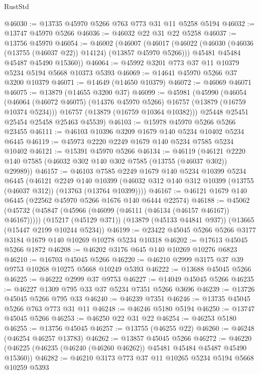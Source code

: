 \begin{lexlean}{RustStd}
\begin{coremodule}
@46030 := @13735 @45970 @5266 @763 @773 @31 @11 @5258 @5194
@46032 := @13747 @45970 @5266
@46036 := @46032 @22 @31 @22 @5258
@46037 := @13756 @45970
@46054 := @46002
    (@46007
      (@46017
        (@46022 (@46030 (@46036 (@13755 (@46037 @22)) @14124) (@13857 @45970 @5266)))
        @45481
        @45484
        @45487
        @45490
        @15360))
@46064 := @45992 @3201 @773 @37 @11 @10379 @5234 @5194 @5668 @10373 @5393
@46069 := @14641 @45970 @5266 @37 @3200 @10379
@46071 := @14649 (@14650 @10379)
@46072 := @46069 @46071
@46075 := @13879 (@14655 @3200 @37)
@46099 := @45981
    (@45990
      (@46054
        (@46064 (@46072 @46075) (@14376 @45970 @5266) @16757 (@13879 (@16759 @10374 @5234)))
        @16757
        (@13879 (@16759 @10364 @10382)))
      @25448
      @25451
      @25454
      @25458
      @25463
      @45539)
@46103 := @15978 @45970 @5266 @5266 @23455
@46111 := @46103 @10396 @3209 @1679 @140 @5234 @10402 @5234 @6445
@46119 := @45973 @2220 @2249 @1679 @140 @5234 @7585 @5234 @10402
@46121 := @15391 @45970 @5266
@46134 := @46119
    (@46121 @2220 @140 @7585 (@46032 @302 @140 @302 @7585 (@13755 (@46037 @302)) @29989))
@46157 := @46103
    @7585
    @2249
    @1679
    @140
    @5234
    @10399
    @5234
    @6445
    (@46121
      @2249
      @140
      @10399
      (@46032 @312 @140 @312 @10399 (@13755 (@46037 @312)) (@13763 (@13764 @10399))))
@46167 := @46121 @1679 @140 @6445 (@22562 @45970 @5266 @1676 @140 @6444 @22574)
@46188 := @45062
    (@45732 (@45847 (@45966 (@46099 (@46111 (@46134 (@46157 @46167)) @46167)))))
    (@15217 (@45129 @371))
    (@13879 (@45133 @44841 @937))
    (@13665 (@15447 @2199 @10244 @5234))
@46199 := @23422 @45045 @5266 @5266 @3177 @3184 @1679 @140 @10269 @10278 @5234 @10318
@46202 := @17613 @45045 @5266 @1872
@46208 := @46202 @3176 @645 @140 @10269 @10276 @6823
@46210 := @16703 @45045 @5266
@46220 := @46210 @2999 @3175 @37 @39 @9753 @10268 @10275 @5668 @10249 @5393
@46222 := @13688 @45045 @5266
@46225 := @46222 @2999 @37 @9753
@46227 := @14049 @45045 @5266
@46235 := @46227 @1309 @795 @33 @37 @5234 @7351 @5266 @3696
@46239 := @13726 @45045 @5266 @795 @33
@46240 := @46239 @7351
@46246 := @13735 @45045 @5266 @763 @773 @31 @11
@46248 := @46246 @5180 @5194
@46250 := @13747 @45045 @5266
@46253 := @46250 @22 @31 @22
@46254 := @46253 @5180
@46255 := @13756 @45045
@46257 := @13755 (@46255 @22)
@46260 := @46248 (@46254 @46257 @13783)
@46262 := @13857 @45045 @5266
@46272 := @46220 (@46225 (@46235 (@46240 (@46260 @46262)) @45481 @45484 @45487 @45490 @15360))
@46282 := @46210 @3173 @773 @37 @11 @10265 @5234 @5194 @5668 @10259 @5393

\end{coremodule}
\end{lexlean}
